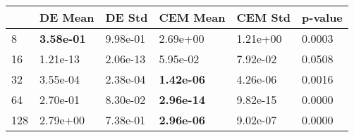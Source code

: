 \begin{tabular}{llllll}
\toprule
{} &            DE Mean &    DE Std &           CEM Mean &   CEM Std & p-value \\
\midrule
8   &  \textbf{3.58e-01} &  9.98e-01 &           2.69e+00 &  1.21e+00 &  0.0003 \\
16  &           1.21e-13 &  2.06e-13 &           5.95e-02 &  7.92e-02 &  0.0508 \\
32  &           3.55e-04 &  2.38e-04 &  \textbf{1.42e-06} &  4.26e-06 &  0.0016 \\
64  &           2.70e-01 &  8.30e-02 &  \textbf{2.96e-14} &  9.82e-15 &  0.0000 \\
128 &           2.79e+00 &  7.38e-01 &  \textbf{2.96e-06} &  9.02e-07 &  0.0000 \\
\bottomrule
\end{tabular}
